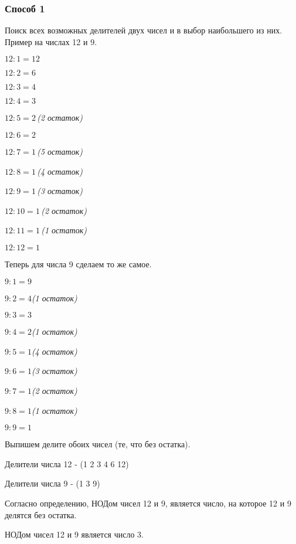 \documentclass[12pt]{article}
\begin{document}
    \subsubsection{Способ 1}
    Поиск всех возможных делителей двух чисел и в выбор наибольшего из них. Пример на числах 12 и 9.\par
    $12 : 1 = 12$\par
    $12 : 2 = 6$\par
    $12 : 3 = 4$\par
    $12 : 4 = 3$\par
    $12 : 5 = 2 \,$\textit{(2 остаток)}\par
    $12 : 6 = 2$\par
    $12 : 7 = 1 \,$\textit{(5 остаток)}\par
    $12 : 8 = 1 \,$\textit{(4 остаток)}\par
    $12 : 9 = 1 \,$\textit{(3 остаток)}\par
    $12 : 10 = 1 \,$\textit{(2 остаток)}\par
    $12 : 11 = 1 \,$\textit{(1 остаток)}\par
    $12 : 12 = 1$\par
    Теперь для числа 9 сделаем то же самое.\par
    $9 : 1 = 9$\par
    $9 : 2 = 4$\textit{(1 остаток)}\par
    $9 : 3 = 3$\par
    $9 : 4 = 2$\textit{(1 остаток)}\par
    $9 : 5 = 1$\textit{(4 остаток)}\par
    $9 : 6 = 1$\textit{(3 остаток)}\par
    $9 : 7 = 1$\textit{(2 остаток)}\par
    $9 : 8 = 1$\textit{(1 остаток)}\par
    $9 : 9 = 1$\par
    Выпишем делите обоих чисел (те, что без остатка).\par
    Делители числа 12 - (1 2 3 4 6 12)\par
    Делители числа 9 - (1 3 9)\par
    Согласно определению, НОДом чисел 12 и 9, является число, на которое 12 и 9 делятся без остатка.\par
    НОДом чисел 12 и 9 является число 3.\par
\end{document}
